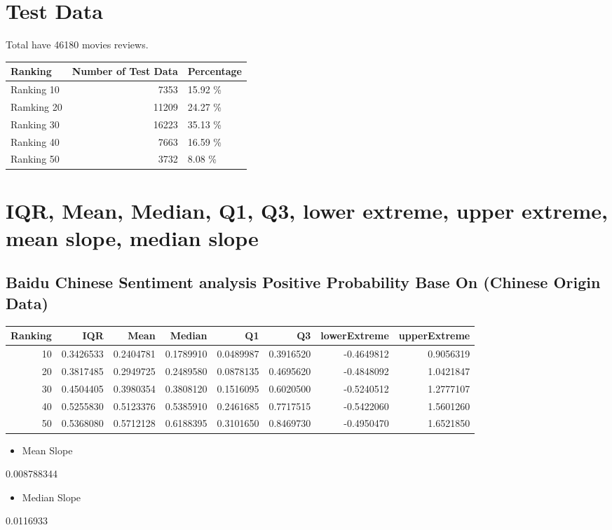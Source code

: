 \documentclass[conference,compsoc]{IEEEtran}
\begin{document}
\section{Test Data}
Total have 46180 movies reviews.
\begin{center}
  \begin{tabular}{lrl}
    Ranking & Number of Test Data & Percentage\\
    \hline
    Ranking 10 & 7353 & 15.92 \%\\
    Ramking 20 & 11209 & 24.27 \%\\
    Ranking 30 & 16223 & 35.13 \%\\
    Ranking 40 & 7663 & 16.59 \%\\
    Ranking 50 & 3732 & 8.08 \%\\
  \end{tabular}
\end{center}

\section{IQR, Mean, Median, Q1, Q3, lower extreme, upper extreme, mean slope, median slope}
\subsection{Baidu Chinese Sentiment analysis Positive Probability Base On (Chinese Origin Data)}
\begin{center}
\begin{tabular}{rrrrrrrr}
Ranking & IQR & Mean & Median & Q1 & Q3 & lowerExtreme & upperExtreme\\
\hline
10 & 0.3426533 & 0.2404781 & 0.1789910 & 0.0489987 & 0.3916520 & -0.4649812 & 0.9056319\\
20 & 0.3817485 & 0.2949725 & 0.2489580 & 0.0878135 & 0.4695620 & -0.4848092 & 1.0421847\\
30 & 0.4504405 & 0.3980354 & 0.3808120 & 0.1516095 & 0.6020500 & -0.5240512 & 1.2777107\\
40 & 0.5255830 & 0.5123376 & 0.5385910 & 0.2461685 & 0.7717515 & -0.5422060 & 1.5601260\\
50 & 0.5368080 & 0.5712128 & 0.6188395 & 0.3101650 & 0.8469730 & -0.4950470 & 1.6521850\\
\end{tabular}
\end{center}
\begin{itemize}
\item Mean Slope
\end{itemize}
0.008788344
\begin{itemize}
\item Median Slope
\end{itemize}
0.0116933
\end{document}
